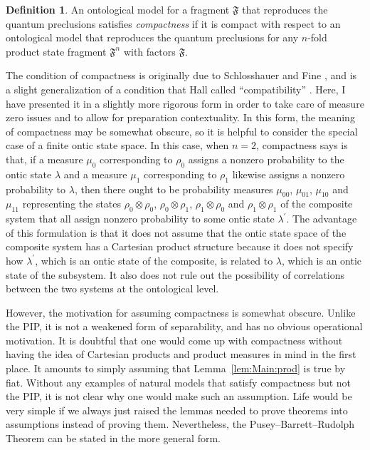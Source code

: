 \documentclass[DIV=calc,paper=a4,fontsize=11pt,twocolumn]{scrartcl} %
\theoremstyle{definition}
\newtheorem{definition}{Definition}[section]
\theoremstyle{plain}
\begin{document}
\begin{definition}
An ontological model for a fragment $\mathfrak{F}$ that reproduces
the quantum preclusions satisfies \emph{compactness} if it is
compact with respect to an ontological model that reproduces the
quantum preclusions for any $n$-fold product state fragment
$\mathfrak{F}^n$ with factors $\mathfrak{F}$.
\end{definition}

The condition of compactness is originally due to Schlosshauer and
Fine \cite{Schlosshauer2012}, and is a slight generalization of a
condition that Hall called ``compatibility'' \cite{Hall2011}.  Here, I
have presented it in a slightly more rigorous form in order to take
care of measure zero issues and to allow for preparation
contextuality.  In this form, the meaning of compactness may be
somewhat obscure, so it is helpful to consider the special case of a
finite ontic state space.  In this case, when $n=2$, compactness says
is that, if a measure $\mu_0$ corresponding to $\rho_0$ assigns a
nonzero probability to the ontic state $\lambda$ and a measure $\mu_1$
corresponding to $\rho_1$ likewise assigns a nonzero probability to
$\lambda$, then there ought to be probability measures $\mu_{00}$,
$\mu_{01}$, $\mu_{10}$ and $\mu_{11}$ representing the states $\rho_0
\otimes \rho_0$, $\rho_0 \otimes \rho_1$, $\rho_1 \otimes \rho_0$ and
$\rho_1 \otimes \rho_1$ of the composite system that all assign
nonzero probability to some ontic state $\lambda^{\prime}$.  The
advantage of this formulation is that it does not assume that the
ontic state space of the composite system has a Cartesian product
structure because it does not specify how $\lambda^{\prime}$, which is
an ontic state of the composite, is related to $\lambda$, which is an
ontic state of the subsystem.  It also does not rule out the
possibility of correlations between the two systems at the ontological
level.

However, the motivation for assuming compactness is somewhat obscure.
Unlike the PIP, it is not a weakened form of separability, and has no
obvious operational motivation.  It is doubtful that one would come up
with compactness without having the idea of Cartesian products and
product measures in mind in the first place.  It amounts to simply
assuming that Lemma~\ref{lem:Main:prod} is true by fiat.  Without any
examples of natural models that satisfy compactness but not the PIP,
it is not clear why one would make such an assumption.  Life would be
very simple if we always just raised the lemmas needed to prove
theorems into assumptions instead of proving them.  Nevertheless, the
Pusey--Barrett--Rudolph Theorem can be stated in the more general form.
\end{document}
